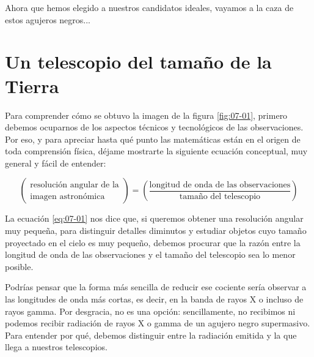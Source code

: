 Ahora que hemos elegido a nuestros candidatos ideales, vayamos a la caza de estos agujeros negros...

\section{Un telescopio del tamaño de la Tierra}\label{sec:07-telescope}

Para comprender cómo se obtuvo la imagen de la figura \ref{fig:07-01}, primero debemos ocuparnos de los aspectos técnicos y tecnológicos de las observaciones. Por eso, y para apreciar hasta qué punto las matemáticas están en el origen de toda comprensión física, déjame mostrarte la siguiente ecuación conceptual, muy general y fácil de entender:

\begin{equation}\label{eq:07-01}
\begin{pmatrix}\text{resolución angular de la} \\ \text{imagen astronómica}\end{pmatrix}
=\left(\frac{\text{longitud de onda de las observaciones}}{\text{tamaño del telescopio}}\right)
\end{equation}


La ecuación \eqref{eq:07-01} nos dice que, si queremos obtener una resolución angular muy pequeña, para distinguir detalles diminutos y estudiar objetos cuyo tamaño proyectado en el cielo es muy pequeño, debemos procurar que la razón entre la longitud de onda de las observaciones y el tamaño del telescopio sea lo menor posible.

Podrías pensar que la forma más sencilla de reducir ese cociente sería observar a las longitudes de onda más cortas, es decir, en la banda de rayos X o incluso de rayos gamma. Por desgracia, no es una opción: sencillamente, no recibimos ni podemos recibir radiación de rayos X o gamma de un agujero negro supermasivo. Para entender por qué, debemos distinguir entre la radiación emitida y la que llega a nuestros telescopios.

